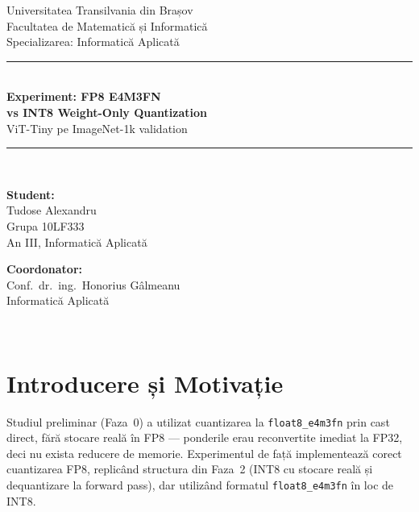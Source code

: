 \documentclass[12pt,a4paper]{article}
\begin{document}

\begin{titlepage}
  \centering
  {\large Universitatea Transilvania din Brașov\\}
  {\small Facultatea de Matematică și Informatică\\}
  {\small Specializarea: Informatică Aplicată\\[2cm]}

  \rule{\linewidth}{0.4pt}\\[0.5cm]
  {\LARGE\bfseries Experiment: FP8 E4M3FN\\[0.3cm]}
  {\Large\bfseries vs INT8 Weight-Only Quantization\\[0.2cm]}
  {\large ViT-Tiny pe ImageNet-1k validation}\\[0.3cm]
  \rule{\linewidth}{0.4pt}\\[2cm]

  \begin{minipage}{0.45\textwidth}
    \textbf{Student:}\\
    Tudose Alexandru\\
    Grupa 10LF333\\
    An III, Informatică Aplicată
  \end{minipage}
  \hfill
  \begin{minipage}{0.45\textwidth}
    \raggedleft
    \textbf{Coordonator:}\\
    Conf.\ dr.\ ing.\ Honorius Gâlmeanu\\
    Informatică Aplicată
  \end{minipage}\\[3cm]
\end{titlepage}

\tableofcontents
\newpage

\section{Introducere și Motivație}

Studiul preliminar (Faza~0) a utilizat cuantizarea la \texttt{float8\_e4m3fn}
prin cast direct, fără stocare reală în FP8 --- ponderile erau reconvertite
imediat la FP32, deci nu exista reducere de memorie. Experimentul de față
implementează corect cuantizarea FP8, replicând structura din Faza~2
(INT8 cu stocare reală și dequantizare la forward pass), dar utilizând
formatul \texttt{float8\_e4m3fn} în loc de INT8.
\end{document}
